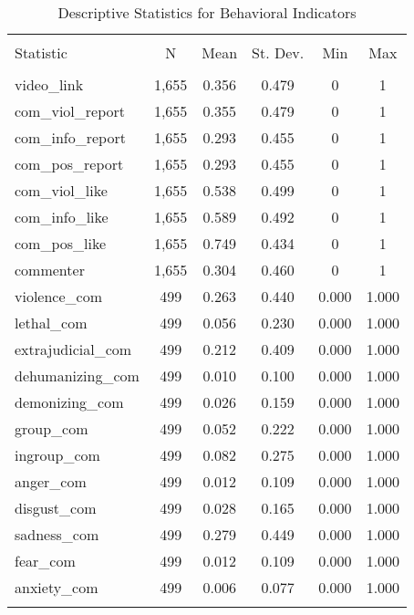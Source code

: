 
\begin{table}[H] \centering 
  \caption{Descriptive Statistics for Behavioral Indicators} 
  \label{} 
\begin{tabular}{@{\extracolsep{5pt}}lccccc} 
\\[-1.8ex]\hline 
\hline \\[-1.8ex] 
Statistic & \multicolumn{1}{c}{N} & \multicolumn{1}{c}{Mean} & \multicolumn{1}{c}{St. Dev.} & \multicolumn{1}{c}{Min} & \multicolumn{1}{c}{Max} \\ 
\hline \\[-1.8ex] 
video\_link & 1,655 & 0.356 & 0.479 & 0 & 1 \\ 
com\_viol\_report & 1,655 & 0.355 & 0.479 & 0 & 1 \\ 
com\_info\_report & 1,655 & 0.293 & 0.455 & 0 & 1 \\ 
com\_pos\_report & 1,655 & 0.293 & 0.455 & 0 & 1 \\ 
com\_viol\_like & 1,655 & 0.538 & 0.499 & 0 & 1 \\ 
com\_info\_like & 1,655 & 0.589 & 0.492 & 0 & 1 \\ 
com\_pos\_like & 1,655 & 0.749 & 0.434 & 0 & 1 \\ 
commenter & 1,655 & 0.304 & 0.460 & 0 & 1 \\ 
violence\_com & 499 & 0.263 & 0.440 & 0.000 & 1.000 \\ 
lethal\_com & 499 & 0.056 & 0.230 & 0.000 & 1.000 \\ 
extrajudicial\_com & 499 & 0.212 & 0.409 & 0.000 & 1.000 \\ 
dehumanizing\_com & 499 & 0.010 & 0.100 & 0.000 & 1.000 \\ 
demonizing\_com & 499 & 0.026 & 0.159 & 0.000 & 1.000 \\ 
group\_com & 499 & 0.052 & 0.222 & 0.000 & 1.000 \\ 
ingroup\_com & 499 & 0.082 & 0.275 & 0.000 & 1.000 \\ 
anger\_com & 499 & 0.012 & 0.109 & 0.000 & 1.000 \\ 
disgust\_com & 499 & 0.028 & 0.165 & 0.000 & 1.000 \\ 
sadness\_com & 499 & 0.279 & 0.449 & 0.000 & 1.000 \\ 
fear\_com & 499 & 0.012 & 0.109 & 0.000 & 1.000 \\ 
anxiety\_com & 499 & 0.006 & 0.077 & 0.000 & 1.000 \\ 
\hline \\[-1.8ex] 
\end{tabular} 
\end{table} 

